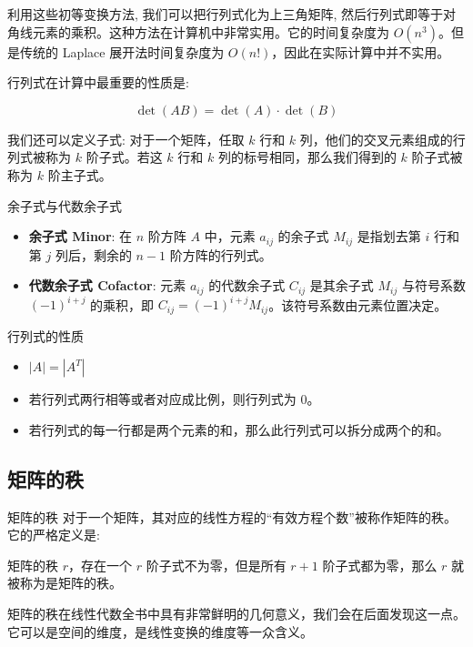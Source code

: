 \documentclass[a4paper,12pt]{ctexart}
\begin{document}
利用这些初等变换方法, 我们可以把行列式化为上三角矩阵, 然后行列式即等于对角线元素的乘积。这种方法在计算机中非常实用。它的时间复杂度为 $O(n^3)$。但是传统的 Laplace 展开法时间复杂度为 $O(n!)$，因此在实际计算中并不实用。

行列式在计算中最重要的性质是:

\[
\det(AB) = \det(A) \cdot \det(B)
\]

\newpage
        
        我们还可以定义子式: 对于一个矩阵，任取 $k$ 行和 $k$ 列，他们的交叉元素组成的行列式被称为 $k$ 阶子式。若这 $k$ 行和 $k$ 列的标号相同，那么我们得到的 $k$ 阶子式被称为 $k$ 阶主子式。
        
        \begin{mydef}{余子式与代数余子式}{}
            \begin{itemize}
                \item \textbf{余子式 Minor}: 在 $n$ 阶方阵 $A$ 中，元素 $a_{ij}$ 的余子式 $M_{ij}$ 是指划去第 $i$ 行和第 $j$ 列后，剩余的 $n-1$ 阶方阵的行列式。
                \item \textbf{代数余子式 Cofactor}: 元素 $a_{ij}$ 的代数余子式 $C_{ij}$ 是其余子式 $M_{ij}$ 与符号系数 $(-1)^{i+j}$ 的乘积，即 $C_{ij} = (-1)^{i+j} M_{ij}$。该符号系数由元素位置决定。
            \end{itemize}
        \end{mydef}
        
        \begin{myprop}{行列式的性质}{}
        \begin{itemize}
            \item $|A| = |A^T|$
            \item 若行列式两行相等或者对应成比例，则行列式为 $0$。
            \item 若行列式的每一行都是两个元素的和，那么此行列式可以拆分成两个的和。
        \end{itemize}
\end{myprop}

\subsection{矩阵的秩}
\begin{mydef}{矩阵的秩}{}
    对于一个矩阵，其对应的线性方程的“有效方程个数”被称作矩阵的秩。它的严格定义是:
            
            矩阵的秩 $r$，存在一个 $r$ 阶子式不为零，但是所有 $r+1$ 阶子式都为零，那么 $r$ 就被称为是矩阵的秩。
            
    矩阵的秩在线性代数全书中具有非常鲜明的几何意义，我们会在后面发现这一点。它可以是空间的维度，是线性变换的维度等一众含义。
\end{mydef}
\end{document}
